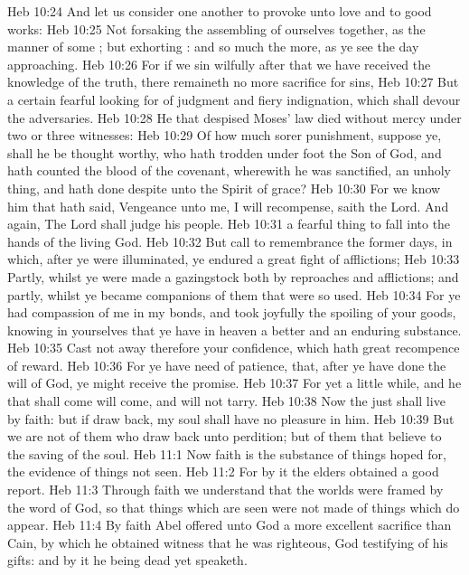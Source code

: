 \vs Heb 10:24 And let us consider one another to provoke unto love and to good works:
\vs Heb 10:25 Not forsaking the assembling of ourselves together, as the manner of some ; but exhorting : and so much the more, as ye see the day approaching.
\vs Heb 10:26 For if we sin wilfully after that we have received the knowledge of the truth, there remaineth no more sacrifice for sins,
\vs Heb 10:27 But a certain fearful looking for of judgment and fiery indignation, which shall devour the adversaries.
\vs Heb 10:28 He that despised Moses' law died without mercy under two or three witnesses:
\vs Heb 10:29 Of how much sorer punishment, suppose ye, shall he be thought worthy, who hath trodden under foot the Son of God, and hath counted the blood of the covenant, wherewith he was sanctified, an unholy thing, and hath done despite unto the Spirit of grace?
\vs Heb 10:30 For we know him that hath said, Vengeance  unto me, I will recompense, saith the Lord. And again, The Lord shall judge his people.
\vs Heb 10:31  a fearful thing to fall into the hands of the living God.
\vs Heb 10:32 But call to remembrance the former days, in which, after ye were illuminated, ye endured a great fight of afflictions;
\vs Heb 10:33 Partly, whilst ye were made a gazingstock both by reproaches and afflictions; and partly, whilst ye became companions of them that were so used.
\vs Heb 10:34 For ye had compassion of me in my bonds, and took joyfully the spoiling of your goods, knowing in yourselves that ye have in heaven a better and an enduring substance.
\vs Heb 10:35 Cast not away therefore your confidence, which hath great recompence of reward.
\vs Heb 10:36 For ye have need of patience, that, after ye have done the will of God, ye might receive the promise.
\vs Heb 10:37 For yet a little while, and he that shall come will come, and will not tarry.
\vs Heb 10:38 Now the just shall live by faith: but if  draw back, my soul shall have no pleasure in him.
\vs Heb 10:39 But we are not of them who draw back unto perdition; but of them that believe to the saving of the soul.
\vs Heb 11:1 Now faith is the substance of things hoped for, the evidence of things not seen.
\vs Heb 11:2 For by it the elders obtained a good report.
\vs Heb 11:3 Through faith we understand that the worlds were framed by the word of God, so that things which are seen were not made of things which do appear.
\vs Heb 11:4 By faith Abel offered unto God a more excellent sacrifice than Cain, by which he obtained witness that he was righteous, God testifying of his gifts: and by it he being dead yet speaketh.
